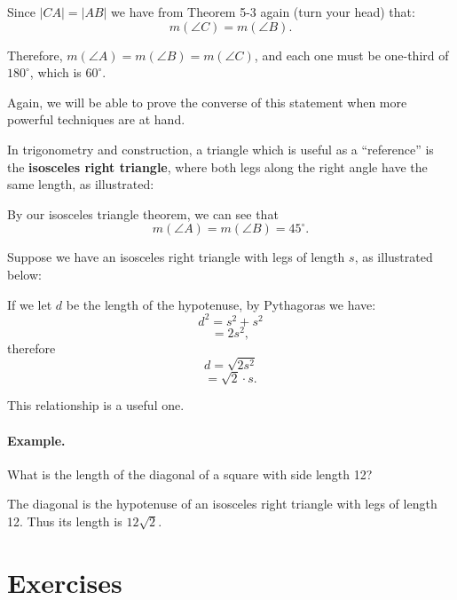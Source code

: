 \documentclass[12pt]{book} %
\begin{document}
Since $|CA|=|AB|$ we have from Theorem 5-3 again (turn your head) that:
\[
m(\angle C)=m(\angle B).
\]

Therefore, $m(\angle A)=m(\angle B)=m(\angle C)$, and each one must be one-third of $180^\circ$, which is $60^\circ$.

Again, we will be able to prove the converse of this statement when more powerful techniques are at hand.

In trigonometry and construction, a triangle which is useful as a ``reference'' is the \textbf{isosceles right triangle}, where both legs along the right angle have the same length, as illustrated:


By our isosceles triangle theorem, we can see that
\[
m(\angle A)=m(\angle B)=45^\circ.
\]

Suppose we have an isosceles right triangle with legs of length $s$, as illustrated below:


If we let $d$ be the length of the hypotenuse, by Pythagoras we have:
\[
d^2=s^2+s^2
\]
\[
=2s^2,
\]
therefore
\[
d=\sqrt{2s^2}
\]
\[
=\sqrt{2}\cdot s.
\]

This relationship is a useful one.


\paragraph{Example.}
What is the length of the diagonal of a square with side length 12?


The diagonal is the hypotenuse of an isosceles right triangle with legs of length 12. Thus its length is $12\sqrt{2}$.

\section*{Exercises}
\end{document}
